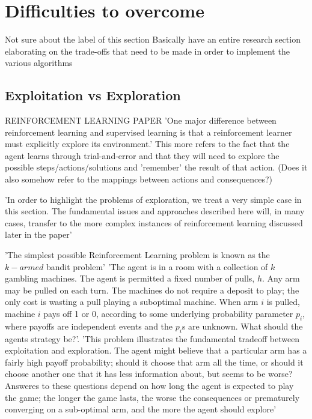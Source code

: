 \section{Difficulties to overcome}
Not sure about the label of this section
Basically have an entire research section elaborating on the trade-offs that need to be made in order to implement the various algorithms

\subsection{Exploitation vs Exploration} REINFORCEMENT LEARNING PAPER \cite{KaelblingLittmanMoore1996}
'One major difference between reinforcement learning and supervised learning is that a reinforcement learner must explicitly explore its environment.' \cite{KaelblingLittmanMoore1996}
This more refers to the fact that the agent learns through trial-and-error and that they will need to explore the possible steps/actions/solutions and 'remember' the result of that action. (Does it also somehow refer to the mappings between actions and consequences?)

'In order to highlight the problems of exploration, we treat a very simple case in this section. The fundamental issues and approaches described here will, in many cases, transfer to the more complex instances of reinforcement learning discussed later in the paper' \cite{KaelblingLittmanMoore1996}

'The simplest possible Reinforcement Learning problem is known as the $k-armed$ bandit problem' \cite{KaelblingLittmanMoore1996}
'The agent is in a room with a collection of $k$ gambling machines. The agent is permitted a fixed number of pulls, $h$. Any arm may be pulled on each turn. The machines do not require a deposit to play; the only cost is wasting a pull playing a suboptimal machine. When arm $i$ is pulled, machine $i$ pays off 1 or 0, according to some underlying probability parameter $p_i$, where payoffs are independent events and the $p_i$s are unknown. What should the agents strategy be?'\cite{KaelblingLittmanMoore1996}.
'This problem illustrates the fundamental tradeoff between exploitation and exploration. The agent might believe that a particular arm has a fairly high payoff probability; should it choose that arm all the time, or should it choose another one that it has less information about, but seems to be worse? Answeres to these questions depend on how long the agent is expected to play the game; the longer the game lasts, the worse the consequences or prematurely converging on a sub-optimal arm, and the more the agent should explore'



